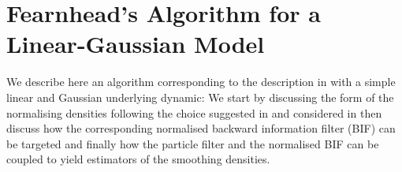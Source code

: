 
\section{\label{app:fearnhead-lg}Fearnhead's Algorithm for a Linear-Gaussian Model }
We describe here an algorithm corresponding to the description in \citep{fearnhead10} with a simple linear and Gaussian underlying dynamic:
%
We start by discussing the form of the normalising densities following the choice suggested in \citep{briers10} and considered in \citep{fearnhead10} then discuss how the corresponding normalised backward information filter (BIF) can be targeted and finally how the particle filter and the normalised BIF can be coupled to yield estimators of the smoothing densities. %
